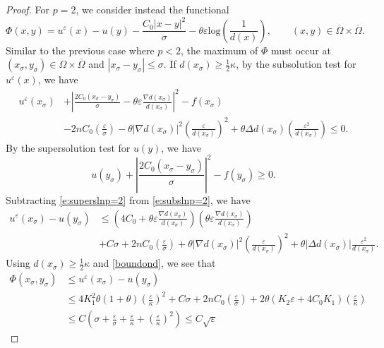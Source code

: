 \documentclass[11pt,reqno]{amsart}
\numberwithin{figure}{section}
\theoremstyle{plain}
\theoremstyle{remark}
\numberwithin{equation}{section}
\begin{document}
\begin{proof}
\noindent For $p=2$, we consider instead the functional 
\begin{equation*}
    \Phi(x,y) = u^\varepsilon(x) - u(y) - \frac{C_0|x-y|^2}{\sigma} - \theta \varepsilon \mathrm{log}\left(\frac{1}{d(x)}\right), \qquad (x,y)\in \overline{\Omega}\times \overline{\Omega}.
\end{equation*}
Similar to the previous case where $p<2$, the maximum of $\Phi$ must occur at $(x_\sigma,y_\sigma)\in \Omega\times\overline{\Omega}$ and $|x_\sigma - y_\sigma|\leq \sigma$. If $d(x_\sigma)\geq \frac{1}{2}\kappa$, by the subsolution test for $u^\varepsilon(x)$, we have
\begin{align}\label{e:subslnp=2}
    u^\varepsilon(x_\sigma)&+ \left|\frac{2C_0(x_\sigma - y_\sigma)}{\sigma} - \theta \varepsilon \frac{\nabla d(x_\sigma)}{d(x_\sigma)}\right|^2  -f(x_\sigma) \nonumber\\
    &- 2nC_0\left(\frac{\varepsilon}{\sigma}\right) - \theta |\nabla d(x_\sigma)|^2 \left(\frac{\varepsilon}{d(x_\sigma)}\right)^2  + \theta \Delta d(x_\sigma)\left(\frac{\varepsilon^2}{d(x_\sigma)}\right) \leq 0.
\end{align}
By the supersolution test for $u(y)$, we have
\begin{equation}\label{e:superslnp=2}
    u(y_\sigma) + \left|\frac{2C_0(x_\sigma - y_\sigma)}{\sigma}\right|^2 - f(y_\sigma) \geq 0.
\end{equation}
Subtracting \eqref{e:superslnp=2} from \eqref{e:subslnp=2}, we have
\begin{align*}
    u^\varepsilon(x_\sigma) - u(y_\sigma) &\leq \left(4C_0+ \theta\varepsilon\frac{\nabla d(x_\sigma)}{d(x_\sigma)}\right)\left(\theta \varepsilon \frac{ \nabla d(x_\sigma)}{d(x_\sigma)}\right) \\
    &+ C\sigma + 2nC_0 \left(\frac{\varepsilon}{\sigma}\right)+ \theta |\nabla d(x_\sigma)|^2 \left(\frac{\varepsilon}{d(x_\sigma)}\right)^2 + \theta|\Delta d(x_\sigma)| \frac{\varepsilon^2}{d(x_\sigma)}.
\end{align*}
Using $d(x_\sigma)\geq \frac{1}{2}\kappa$ and \eqref{boundond}, we see that
\begin{align}\label{p=2a}
    \Phi(x_\sigma,y_\sigma)&\leq u^\varepsilon(x_\sigma) - u(y_\sigma)\nonumber \\
    &\leq 4K_1^2\theta(1+\theta)\left(\frac{\varepsilon}{\kappa}\right)^2 + C\sigma + 2nC_0\left( \frac{\varepsilon}{\sigma}\right) + 2\theta(K_2\varepsilon+4C_0K_1)\left(\frac{\varepsilon}{\kappa}\right)\nonumber\\
    &\leq C\left(\sigma+\frac{\varepsilon}{\sigma} + \frac{\varepsilon}{\kappa} + \left(\frac{\varepsilon}{\kappa}\right)^2\right) \leq C\sqrt{\varepsilon}

\end{align}
\end{proof}
\end{document}
